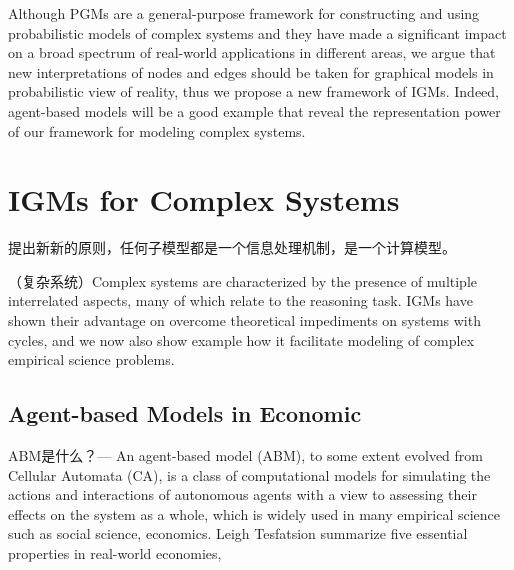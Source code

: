 \documentclass[10pt,onecolumn,letterpaper]{article}
\begin{document}
\begin{CJK*}{UTF8}{gbsn}
Although PGMs are a general-purpose framework for constructing and using probabilistic models of complex systems and they have made a significant impact on a broad spectrum of real-world applications in different areas, we argue that new interpretations of nodes and edges should be taken for graphical models in probabilistic view of reality, thus we propose a new framework of IGMs. Indeed, agent-based models will be a good example that reveal the representation power of our framework for modeling complex systems.



\section{IGMs for Complex Systems}

提出新新的原则，任何子模型都是一个信息处理机制，是一个计算模型。


（复杂系统）Complex systems are characterized by the presence of multiple interrelated aspects, many of which relate to the reasoning task. 
IGMs have shown their advantage on overcome theoretical impediments on systems with cycles, and we now also show example how it facilitate modeling of complex empirical science problems.

\subsection{Agent-based Models in Economic}

ABM是什么？---
An agent-based model (ABM), to some extent evolved from Cellular Automata (CA), is a class of computational models for simulating the actions and interactions of autonomous agents with a view to assessing their effects on the system as a whole, which is widely used in many empirical science such as social science, economics. Leigh Tesfatsion summarize five essential properties in real-world economies, 


\end{CJK*}
\end{document}
